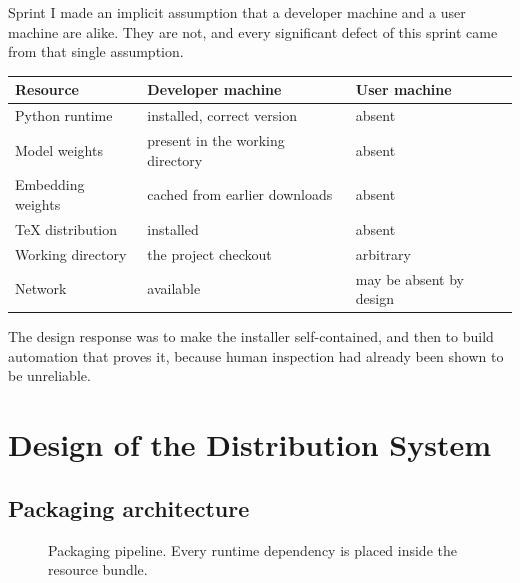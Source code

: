 \documentclass[11pt,a4paper]{article}
\begin{document}
Sprint I made an implicit assumption that a developer machine and a user
machine are alike. They are not, and every significant defect of this sprint
came from that single assumption.

\begin{center}
\small
\begin{tabularx}{\linewidth}{@{}lXX@{}}
\toprule
\textbf{Resource} & \textbf{Developer machine} & \textbf{User machine} \\
\midrule
Python runtime & installed, correct version & absent \\
Model weights & present in the working directory & absent \\
Embedding weights & cached from earlier downloads & absent \\
TeX distribution & installed & absent \\
Working directory & the project checkout & arbitrary \\
Network & available & may be absent by design \\
\bottomrule
\end{tabularx}
\end{center}

The design response was to make the installer self-contained, and then to build
automation that proves it, because human inspection had already been shown to be
unreliable.

\section{Design of the Distribution System}

\subsection{Packaging architecture}

\begin{figure}[H]
\centering
{}
\caption{Packaging pipeline. Every runtime dependency is placed inside the resource bundle.}
\end{figure}
\end{document}
